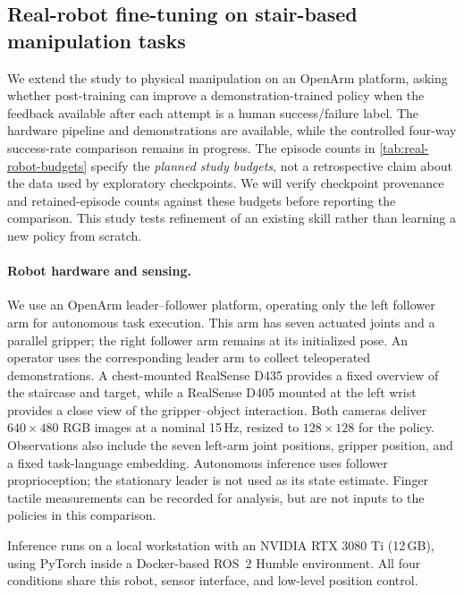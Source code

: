 \subsection{Real-robot fine-tuning on stair-based manipulation tasks}
\label{sec:exp-real-robot}

We extend the study to physical manipulation on an OpenArm platform, asking
whether post-training can improve a demonstration-trained policy when the
feedback available after each attempt is a human success/failure label.
The hardware pipeline and demonstrations are available, while the controlled
four-way success-rate comparison remains in progress. The episode counts in
\cref{tab:real-robot-budgets} specify the \emph{planned study budgets}, not a
retrospective claim about the data used by exploratory checkpoints. We will
verify checkpoint provenance and retained-episode counts against these budgets
before reporting the comparison. This study tests refinement of an existing
skill rather than learning a new policy from scratch.

\paragraph{Robot hardware and sensing.}
We use an OpenArm leader--follower platform, operating only the left follower
arm for autonomous task execution. This arm has seven actuated joints and a
parallel gripper; the right follower arm remains at its initialized pose.
An operator uses the corresponding leader arm to collect teleoperated
demonstrations. A chest-mounted RealSense D435 provides a fixed overview of
the staircase and target, while a RealSense D405 mounted at the left wrist
provides a close view of the gripper--object interaction. Both cameras deliver
$640\!\times\!480$ RGB images at a nominal 15\,Hz, resized to
$128\!\times\!128$ for the policy. Observations also include the seven left-arm
joint positions, gripper position, and a fixed task-language embedding.
Autonomous inference uses follower proprioception; the stationary leader is
not used as its state estimate. Finger tactile measurements can be recorded
for analysis, but are not inputs to the policies in this comparison.

Inference runs on a local workstation with an NVIDIA RTX 3080 Ti (12\,GB),
using PyTorch inside a Docker-based ROS~2 Humble environment. All four
conditions share this robot, sensor interface, and low-level position control.

